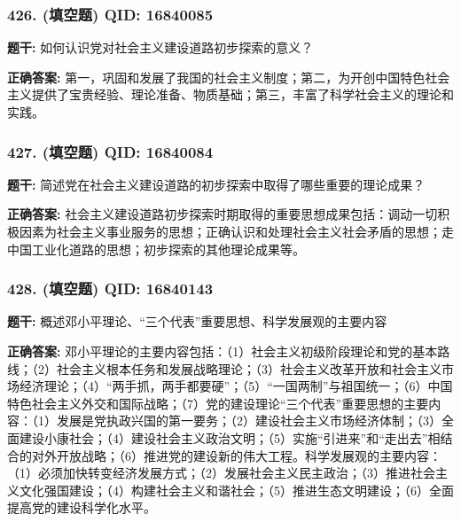 \documentclass[12pt,UTF8]{ctexart}
\begin{document}
\subsubsection*{426. (填空题) \small QID: 16840085}

\textbf{题干:}
如何认识党对社会主义建设道路初步探索的意义？

\textbf{正确答案:}
第一，巩固和发展了我国的社会主义制度；第二，为开创中国特色社会主义提供了宝贵经验、理论准备、物质基础；第三，丰富了科学社会主义的理论和实践。

\vspace{0.3em}\hrulefill\vspace{0.7em}

\subsubsection*{427. (填空题) \small QID: 16840084}

\textbf{题干:}
简述党在社会主义建设道路的初步探索中取得了哪些重要的理论成果？

\textbf{正确答案:}
社会主义建设道路初步探索时期取得的重要思想成果包括：调动一切积极因素为社会主义事业服务的思想；正确认识和处理社会主义社会矛盾的思想；走中国工业化道路的思想；初步探索的其他理论成果等。

\vspace{0.3em}\hrulefill\vspace{0.7em}

\subsubsection*{428. (填空题) \small QID: 16840143}

\textbf{题干:}
概述邓小平理论、“三个代表”重要思想、科学发展观的主要内容

\textbf{正确答案:}
邓小平理论的主要内容包括：（1）社会主义初级阶段理论和党的基本路线；（2）社会主义根本任务和发展战略理论；（3）社会主义改革开放和社会主义市场经济理论；（4）“两手抓，两手都要硬”；（5）“一国两制”与祖国统一；（6）中国特色社会主义外交和国际战略；（7）党的建设理论“三个代表”重要思想的主要内容：（1）发展是党执政兴国的第一要务；（2）建设社会主义市场经济体制；（3）全面建设小康社会；（4）建设社会主义政治文明；（5）实施“引进来”和“走出去”相结合的对外开放战略；（6）推进党的建设新的伟大工程。科学发展观的主要内容：（1）必须加快转变经济发展方式；（2）发展社会主义民主政治；（3）推进社会主义文化强国建设；（4）构建社会主义和谐社会；（5）推进生态文明建设；（6）全面提高党的建设科学化水平。

\vspace{0.3em}\hrulefill\vspace{0.7em}
\end{document}
